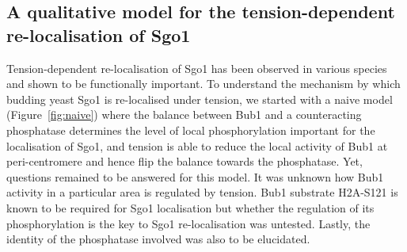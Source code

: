\subsection{A qualitative model for the tension-dependent re-localisation of Sgo1}

Tension-dependent re-localisation of Sgo1 has been observed in various species and shown to be functionally important. To understand the mechanism by which budding yeast Sgo1 is re-localised under tension, we started with a naive model (Figure~\ref{fig:naive}) where the balance between Bub1 and a counteracting phosphatase determines the level of local phosphorylation important for the localisation of Sgo1, and tension is able to reduce the local activity of Bub1 at peri-centromere and hence flip the balance towards the phosphatase. Yet, questions remained to be answered for this model. It was unknown how Bub1 activity in a particular area is regulated by tension. Bub1 substrate H2A-S121 is known to be required for Sgo1 localisation but whether the regulation of its phosphorylation is the key to Sgo1 re-localisation was untested. Lastly, the identity of the phosphatase involved was also to be elucidated. 

